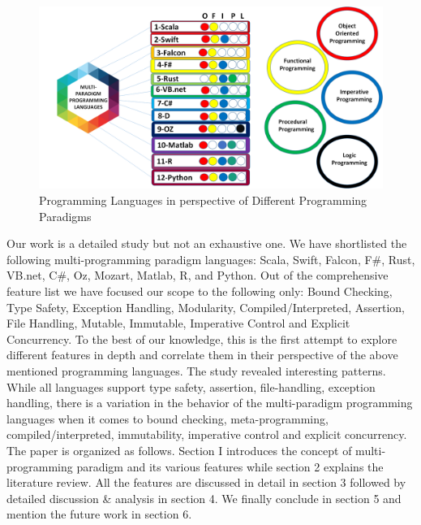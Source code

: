 \documentclass{sig-alternate}
\begin{document}
\begin{figure}
  \includegraphics[width=\linewidth]{langVSparadigm.png}
  \caption{Programming Languages in perspective of Different Programming Paradigms}
	\label{fig:langVSpara}
\end{figure}

  Our work is a detailed study but not an exhaustive one. We have shortlisted the following multi-programming paradigm languages: Scala, Swift, Falcon, F\#, Rust, VB.net, C\#, Oz, Mozart, Matlab, R, and Python. Out of the comprehensive feature list we have focused our scope to the following only: Bound Checking, Type Safety, Exception Handling, Modularity, Compiled/Interpreted, Assertion, File Handling, Mutable, Immutable, Imperative Control and Explicit Concurrency. To the best of our knowledge, this is the first attempt to explore different features in depth and correlate them in their perspective of the above mentioned programming languages. The study revealed interesting patterns. While all languages support type safety, assertion, file-handling, exception handling, there is a variation in the behavior of the multi-paradigm programming languages when it comes to bound checking, meta-programming, compiled/interpreted, immutability, imperative control and explicit concurrency.\\
	The paper is organized as follows. Section I introduces the concept of multi-programming paradigm and its various features while section 2 explains the literature review. All the features are discussed in detail in section 3 followed by detailed discussion & analysis in section 4. We finally conclude in section 5 and mention the future work in section 6.\\
	
\end{document}
